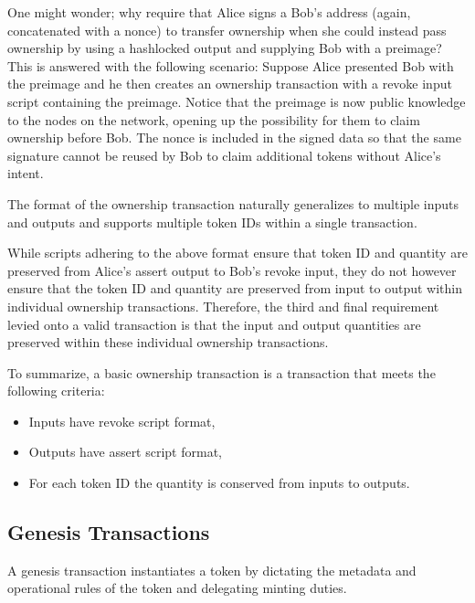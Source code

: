 \documentclass[9pt,oneside]{amsart}
\begin{document}
\begin{multicols}{2}

One might wonder; why require that Alice signs a Bob's address (again, concatenated with a nonce) to transfer ownership when she could instead pass ownership by using a hashlocked output and supplying Bob with a preimage? This is answered with the following scenario: Suppose Alice presented Bob with the preimage and he then creates an ownership transaction with a revoke input script containing the preimage. Notice that the preimage is now public knowledge to the nodes on the network, opening up the possibility for them to claim ownership before Bob. The nonce is included in the signed data so that the same signature cannot be reused by Bob to claim additional tokens without Alice's intent.

The format of the ownership transaction naturally generalizes to multiple inputs and outputs and supports multiple token IDs within a single transaction.

While scripts adhering to the above format ensure that token ID and quantity are preserved from Alice's assert output to Bob's revoke input, they do not however ensure that the token ID and quantity are preserved from input to output within individual ownership transactions. Therefore, the third and final requirement levied onto a valid transaction is that the input and output quantities are preserved within these individual ownership transactions.

To summarize, a basic ownership transaction is a transaction that meets the following criteria:
\begin{itemize}
    \item Inputs have revoke script format,
    \item Outputs have assert script format,
    \item For each token ID the quantity is conserved from inputs to outputs.
\end{itemize}

\subsection{Genesis Transactions}\label{subsec:gentrans}
A genesis transaction instantiates a token by dictating the metadata and operational rules of the token and delegating minting duties.


\end{multicols}
\end{document}
